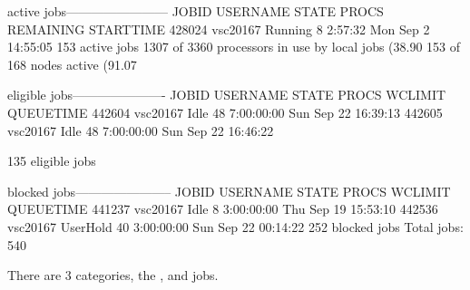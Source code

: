 \begin{prompt}
active jobs------------------------
JOBID     USERNAME  STATE PROCS REMAINING          STARTTIME
428024    vsc20167  Running   8   2:57:32  Mon Sep  2 14:55:05
153 active jobs 1307 of 3360 processors in use by local jobs (38.90%
153 of 168 nodes active      (91.07%

eligible jobs----------------------
JOBID     USERNAME  STATE PROCS   WCLIMIT            QUEUETIME
442604    vsc20167   Idle  48  7:00:00:00  Sun Sep 22 16:39:13
442605    vsc20167   Idle  48  7:00:00:00  Sun Sep 22 16:46:22

135 eligible jobs

blocked jobs-----------------------
JOBID   USERNAME     STATE PROCS WCLIMIT            QUEUETIME
441237  vsc20167      Idle   8 3:00:00:00 Thu Sep 19 15:53:10
442536  vsc20167  UserHold  40 3:00:00:00 Sun Sep 22 00:14:22
252 blocked jobs
Total jobs:  540
\end{prompt}
\fi  %

\ifbrussel
\else
  There are 3 categories, the ,  and  jobs.

